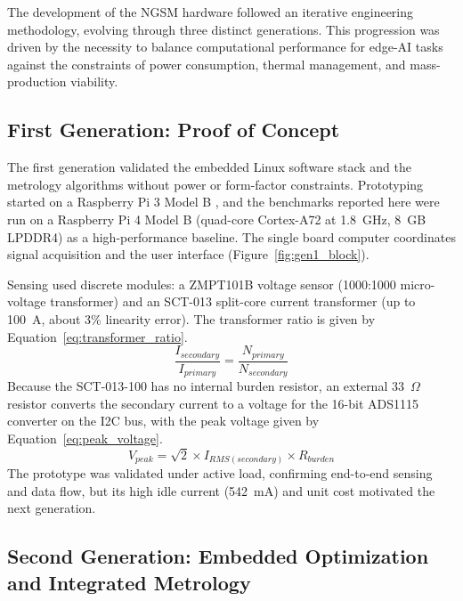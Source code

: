 \documentclass[fleqn,10pt]{wlscirep}
\begin{document}
The development of the NGSM hardware followed an iterative engineering methodology, evolving through three distinct generations. This progression was driven by the necessity to balance computational performance for edge-AI tasks against the constraints of power consumption, thermal management, and mass-production viability.

\subsection{First Generation: Proof of Concept}
\label{subsec:gen1}

The first generation validated the embedded Linux software stack and the metrology algorithms without power or form-factor constraints. Prototyping started on a Raspberry Pi 3 Model B \cite{pi3}, and the benchmarks reported here were run on a Raspberry Pi 4 Model B \cite{pi4} (quad-core Cortex-A72 at 1.8~GHz, 8~GB LPDDR4) as a high-performance baseline. The single board computer coordinates signal acquisition and the user interface (Figure~\ref{fig:gen1_block}).


Sensing used discrete modules: a ZMPT101B voltage sensor \cite{ZMPT101B} (1000:1000 micro-voltage transformer) and an SCT-013 split-core current transformer \cite{SCT013401} (up to 100~A, about 3\% linearity error). The transformer ratio is given by Equation~\ref{eq:transformer_ratio}.
\begin{equation}
\label{eq:transformer_ratio}
\frac{I_{secondary}}{I_{primary}} = \frac{N_{primary}}{N_{secondary}}
\end{equation}
Because the SCT-013-100 has no internal burden resistor, an external 33~$\Omega$ resistor converts the secondary current to a voltage for the 16-bit ADS1115 converter on the I2C bus, with the peak voltage given by Equation~\ref{eq:peak_voltage}.
\begin{equation}
\label{eq:peak_voltage}
V_{peak} = \sqrt{2} \times I_{RMS(secondary)} \times R_{burden}
\end{equation}
The prototype was validated under active load, confirming end-to-end sensing and data flow, but its high idle current (542~mA) and unit cost motivated the next generation.

\subsection{Second Generation: Embedded Optimization and Integrated Metrology}
\label{subsec:gen2}
\end{document}
